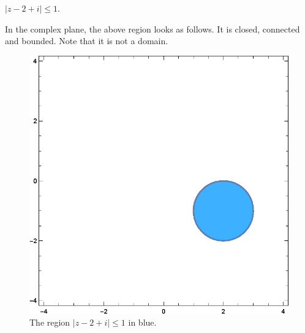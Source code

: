 \documentclass[12pt]{book}
\begin{document}
\begin{exmp}
    $|z - 2 + i| \leq 1.$
\end{exmp}
In the complex plane, the above region looks as follows. It is closed, connected and bounded. Note that it is not a domain. 
\begin{figure}[H]
    \centering
    \includegraphics[scale = 0.7]{./figs/chapter_1/region_plot_1.eps}
    \caption{The region $|z - 2 + i| \leq 1$ in blue.}
\end{figure}
\end{document}
